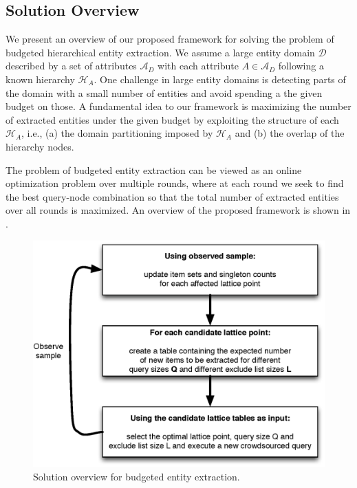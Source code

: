 \documentclass{vldb}
\newcommand{\domain}{\mathcal{D}}
\newcommand{\attributes}{\mathcal{A}_D}
\newcommand{\attrhierarchy}{\mathcal{H}_A}
\begin{document}
%
%
%
%

\subsection{Solution Overview}
We present an overview of our proposed framework for solving the problem of budgeted hierarchical entity extraction. We assume a large entity domain $\domain$ described by a set of attributes $\attributes$ with each attribute $A \in \attributes$ following a known hierarchy $\attrhierarchy$. One challenge in large entity domains is detecting parts of the domain with a small number of entities and avoid spending a the given budget on those. A fundamental idea to our framework is maximizing the number of extracted entities under the given budget by exploiting the structure of each $\attrhierarchy$, i.e., (a) the domain partitioning imposed by $\attrhierarchy$  and (b) the overlap of the hierarchy nodes. 


The problem of budgeted entity extraction can be viewed as an online optimization problem over multiple rounds, where at each round we seek to find the best query-node combination so that the total number of extracted entities over all rounds is maximized. An overview of the proposed framework is shown in .

\begin{figure}
	\begin{center}
	\includegraphics[clip,scale=0.5]{figs/framework.eps}
	\caption{Solution overview for budgeted entity extraction.}
	\label{fig:framework}
	\end{center}
\end{figure}
\end{document}
